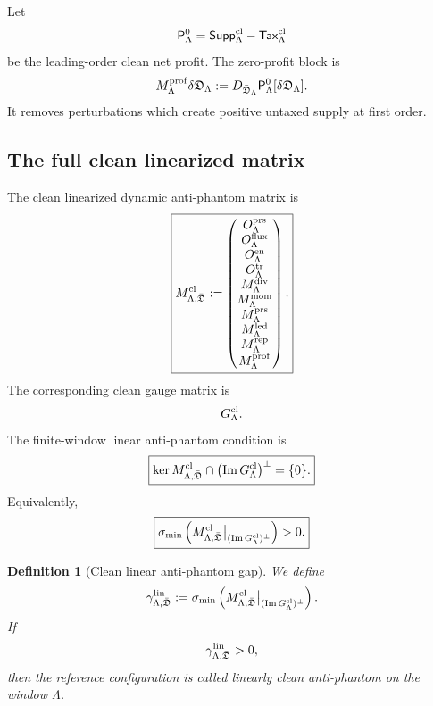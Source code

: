 \documentclass[11pt]{article}
\numberwithin{equation}{section}
\newtheorem{definition}[theorem]{Definition}
\begin{document}
Let
\[
        \mathsf P_\Lambda^{0}
        =
        \mathsf{Supp}_\Lambda^{\rm cl}
        -
        \mathsf{Tax}_\Lambda^{\rm cl}
\]
be the leading-order clean net profit.  The zero-profit block is
\[
        M_\Lambda^{\rm prof}\delta\mathfrak D_\Lambda
        :=
        D_{\bar{\mathfrak D}_\Lambda}
        \mathsf P_\Lambda^{0}
        [\delta\mathfrak D_\Lambda].
\]
It removes perturbations which create positive untaxed supply at first
order.

\subsection{The full clean linearized matrix}

The clean linearized dynamic anti-phantom matrix is
\[
\boxed{
        M_{\Lambda,\bar{\mathfrak D}}^{\rm cl}
        :=
        \begin{pmatrix}
        O_\Lambda^{\rm prs}\\
        O_\Lambda^{\rm flux}\\
        O_\Lambda^{\rm en}\\
        O_\Lambda^{\rm tr}\\
        M_\Lambda^{\rm div}\\
        M_\Lambda^{\rm mom}\\
        M_\Lambda^{\rm prs}\\
        M_\Lambda^{\rm led}\\
        M_\Lambda^{\rm rep}\\
        M_\Lambda^{\rm prof}
        \end{pmatrix}.
}
\]
The corresponding clean gauge matrix is
\[
        G_{\Lambda}^{\rm cl}.
\]
The finite-window linear anti-phantom condition is
\[
\boxed{
        \ker M_{\Lambda,\bar{\mathfrak D}}^{\rm cl}
        \cap
        \bigl(\operatorname{Im}G_\Lambda^{\rm cl}\bigr)^\perp
        =
        \{0\}.
}
\]
Equivalently,
\[
\boxed{
        \sigma_{\min}
        \left(
        M_{\Lambda,\bar{\mathfrak D}}^{\rm cl}
        \big|_{(\operatorname{Im}G_\Lambda^{\rm cl})^\perp}
        \right)
        >0.
}
\]

\begin{definition}[Clean linear anti-phantom gap]
We define
\[
        \gamma_{\Lambda,\bar{\mathfrak D}}^{\rm lin}
        :=
        \sigma_{\min}
        \left(
        M_{\Lambda,\bar{\mathfrak D}}^{\rm cl}
        \big|_{(\operatorname{Im}G_\Lambda^{\rm cl})^\perp}
        \right).
\]
If
\[
        \gamma_{\Lambda,\bar{\mathfrak D}}^{\rm lin}>0,
\]
then the reference configuration is called linearly clean anti-phantom on
the window \(\Lambda\).
\end{definition}
\end{document}
